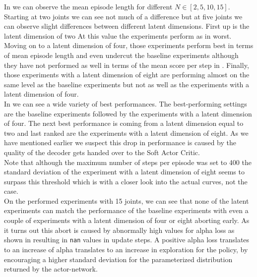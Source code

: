 In  we can observe the mean episode length for different $N \in [2, 5, 10, 15]$. Starting at two joints we can see not much of a difference but at five joints we can observe slight differences between different latent dimensions. First up is the latent dimension of two At this value the experiments perform as in  worst.\\
Moving on to a latent dimension of four, those experiments perform best in terms of mean episode length and even undercut the baseline experiments although they have not performed as well in terms of the mean score per step in . Finally, those experiments with a latent dimension of eight are performing almost on the same level as the baseline experiments but not as well as the experiments with a latent dimension of four. \\
In  we can see a wide variety of best performances. The best-performing settings are the baseline experiments followed by the experiments with a latent dimension of four. The next best performance is coming from a latent dimension equal to two and last ranked are the experiments with a latent dimension of eight. As we have mentioned earlier we suspect this drop in performance is caused by the quality of the decoder gets handed over to the Soft Actor Critic. \\
Note that although the maximum number of steps per episode was set to 400 the standard deviation of the experiment with a latent dimension of eight seems to surpass this threshold which is with a closer look into the actual curves, not the case. \\ 
On the performed experiments with 15 joints, we can see that none of the latent experiments can match the performance of the baseline experiments with even a couple of experiments with a latent dimension of four or eight aborting early. As it turns out this abort is caused by abnormally high values for alpha loss as shown in  resulting in \texttt{nan} values in update steps. A positive alpha loss translates to an increase of alpha translates to an increase in exploration for the policy, by encouraging a higher standard deviation for the parameterized distribution returned by the actor-network.
